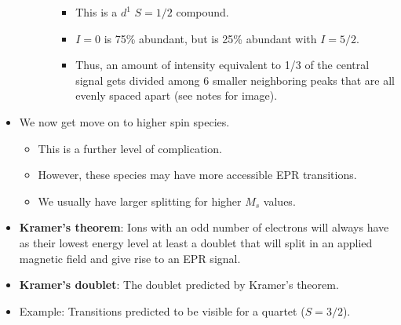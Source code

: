 \documentclass[../notes.tex]{subfiles}
\begin{document}
\begin{itemize}
\begin{enumerate}
\begin{itemize}
            \begin{itemize}
                \item This is a $d^1$ $S=1/2$ compound.
                \item $I=0$ is 75\% abundant, but  is 25\% abundant with $I=5/2$.
                \item Thus, an amount of intensity equivalent to 1/3 of the central signal gets divided among 6 smaller neighboring peaks that are all evenly spaced apart (see notes for image).
            \end{itemize}
        \end{itemize}
    \end{enumerate}
    \item We now get move on to higher spin species.
    \begin{itemize}
        \item This is a further level of complication.
        \item However, these species may have more accessible EPR transitions.
        \item We usually have larger splitting for higher $M_s$ values.
    \end{itemize}
    \item \textbf{Kramer's theorem}: Ions with an odd number of electrons will always have as their lowest energy level at least a doublet that will split in an applied magnetic field and give rise to an EPR signal.
    \item \textbf{Kramer's doublet}: The doublet predicted by Kramer's theorem.
    \item Example: Transitions predicted to be visible for a quartet ($S=3/2$).
    \begin{figure}[H]
        \centering
\end{figure}
\end{itemize}
\end{document}
